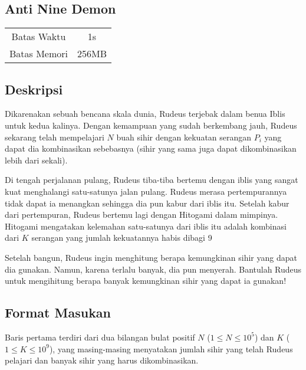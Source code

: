 \documentclass{article}
\begin{document}
\begin{center}

    
    \section*{Anti Nine Demon} %

    \begin{tabular}{ | c c | }
        \hline
        Batas Waktu  & 1s \\    %
        Batas Memori & 256MB \\  %
        \hline
    \end{tabular}
\end{center}

\subsection*{Deskripsi}

Dikarenakan sebuah bencana skala dunia, Rudeus terjebak dalam benua Iblis untuk kedua kalinya. Dengan kemampuan yang sudah berkembang jauh, Rudeus sekarang telah mempelajari $N$ buah sihir dengan kekuatan serangan $P_{i}$ yang dapat dia kombinasikan sebebasnya (sihir yang sama juga dapat dikombinasikan lebih dari sekali). 

Di tengah perjalanan pulang, Rudeus tiba-tiba bertemu dengan iblis yang sangat kuat menghalangi satu-satunya jalan pulang. Rudeus merasa pertempurannya tidak dapat ia menangkan sehingga dia pun kabur dari iblis itu. Setelah kabur dari pertempuran, Rudeus bertemu lagi dengan Hitogami dalam mimpinya. Hitogami mengatakan kelemahan satu-satunya dari iblis itu adalah kombinasi dari $K$ serangan yang jumlah kekuatannya habis dibagi 9

Setelah bangun, Rudeus ingin menghitung berapa kemungkinan sihir yang dapat dia gunakan. Namun, karena terlalu banyak, dia pun menyerah. Bantulah Rudeus untuk mengihitung berapa banyak kemungkinan sihir yang dapat ia gunakan!

\subsection*{Format Masukan}

Baris pertama terdiri dari dua bilangan bulat positif $N$ ($1 \leq N \leq 10^{5}$) dan $K$ ($1 \leq K \leq 10^{9}$), yang masing-masing menyatakan jumlah sihir yang telah Rudeus pelajari dan banyak sihir yang harus dikombinasikan.
\end{document}
